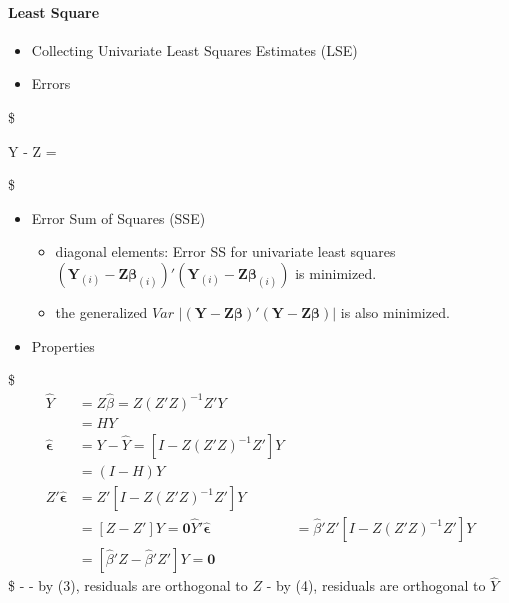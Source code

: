 \documentclass[
]{book}
\providecommand{\tightlist}{%
  \setlength{\itemsep}{0pt}\setlength{\parskip}{0pt}}
\begin{document}
{{\hypertarget{least-square}{%
\paragraph{Least Square}\label{least-square}}

\begin{itemize}
\tightlist
\item
  Collecting Univariate Least Squares Estimates (LSE)
\item
  Errors
\end{itemize}

\$

\pmb Y - \pmb Z \hat {\pmb \beta} =

\$

\begin{itemize}
\tightlist
\item
  Error Sum of Squares (SSE)

  \begin{itemize}
  \tightlist
  \item
    diagonal elements: Error SS for univariate least squares \((\pmb Y_{(i)}-\pmb Z \pmb \beta_{(i)})' (\pmb Y_{(i)}-\pmb Z \pmb \beta_{(i)})\) is minimized.
  \item
    the generalized \(Var\) \(\lvert (\pmb Y-\pmb Z \pmb \beta)' (\pmb Y-\pmb Z \pmb \beta) \rvert\) is also minimized.
  \end{itemize}
\item
  Properties
\end{itemize}

\$
\begin{align*}


\hat {Y} &= Z \hat \beta = Z(Z'Z)^{-1} Z' Y \\
&= HY \tag{Predicted Values}\\

\hat {\pmb \epsilon} &=  Y - \hat Y = \left[ I - Z(Z'Z)^{-1} Z' \right] Y \\
&= (I-H)Y \tag{residuals} \\

Z' \hat {\pmb \epsilon} &=  Z' \left[ I - Z(Z'Z)^{-1} Z' \right] Y \\
&=  [Z-Z'] Y =\pmb 0 \tag{3}


\hat Y' \hat {\pmb \epsilon} &=  \hat {\beta} ' Z' \left[ I - Z(Z'Z)^{-1} Z' \right] Y \\
&=  [\hat {\beta} '  Z- \hat {\beta} '  Z'] Y =\pmb 0 \tag{4}

\end{align*}
\$
- - by (3), residuals are orthogonal to \(Z\)
- by (4), residuals are orthogonal to \(\hat Y\)

}}
\end{document}
